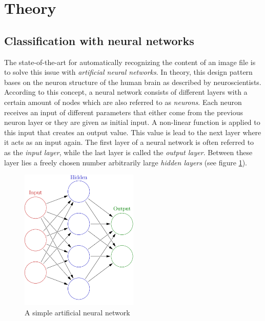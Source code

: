 \documentclass[11pt]{article}
\begin{document}
	\section{Theory}
	\subsection{Classification with neural networks}	
	The state-of-the-art for automatically recognizing the content of an image file is to solve this issue with \textit{artificial neural networks}. In theory, this design pattern bases on the neuron structure of the human brain as described by neuroscientists. According to this concept, a neural network consists of different layers with a certain amount of nodes which are also referred to as \textit{neurons}. Each neuron receives an input of different parameters that either come from the previous neuron layer or they are given as initial input. A non-linear function is applied to this input that creates an output value. This value is lead to the next layer where it acts as an input again. The first layer of a neural network is often referred to as the \textit{input layer}, while the last layer is called the \textit{output layer}. Between these layer lies a freely chosen number arbitrarily large \textit{hidden layers} (see figure \ref{fig:simple-nn}).
	
	\begin{figure}[h!]
		\centering
		\includegraphics[width=0.5\textwidth]{ImagesForReport/simple-nn.png}
		\caption{A simple artificial neural network}
		\label{fig:simple-nn}
	\end{figure}
	
\end{document}
